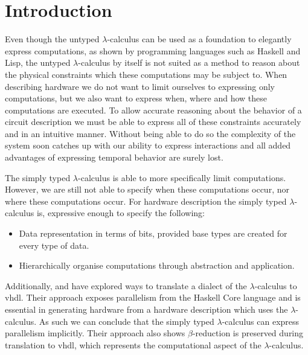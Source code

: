 \section{Introduction}
Even though the untyped $\lambda$-calculus can be used as a foundation to elegantly express computations, as shown by programming languages such as Haskell\cite{jones2003haskell} and Lisp\cite{mccarthy1965lisp}, the untyped $\lambda$-calculus by itself is not suited as a method to reason about the physical constraints which these computations may be subject to.
When describing hardware we do not want to limit ourselves to expressing only computations, but we also want to express when, where and how these computations are executed.
To allow accurate reasoning about the behavior of a circuit description we must be able to express all of these constraints accurately and in an intuitive manner.
Without being able to do so the complexity of the system soon catches up with our ability to express interactions and all added advantages of expressing temporal behavior are surely lost.

The simply typed $\lambda$-calculus is able to more specifically limit computations.
However, we are still not able to specify when these computations occur, nor where these computations occur.
For hardware description the simply typed $\lambda$-calculus is, expressive enough to specify the following:
\begin{itemize}
 \item Data representation in terms of bits, provided base types are created for every type of data.
 \item Hierarchically organise computations through abstraction and application.
\end{itemize}

Additionally, \citeauthor{clashchris} and \citeauthor{kooijman2009haskell} have explored\cite{clashchris,kooijman2009haskell} ways to translate a dialect of the $\lambda$-calculus to \gls{vhdl}.
Their approach exposes parallelism from the Haskell Core language and is essential in generating hardware from a hardware description which uses the $\lambda$-calculus.
As such we can conclude that the simply typed $\lambda$-calculus can express parallelism implicitly.
Their approach also shows $\beta$-reduction is preserved during translation to \gls{vhdl}, which represents the computational aspect of the $\lambda$-calculus.

